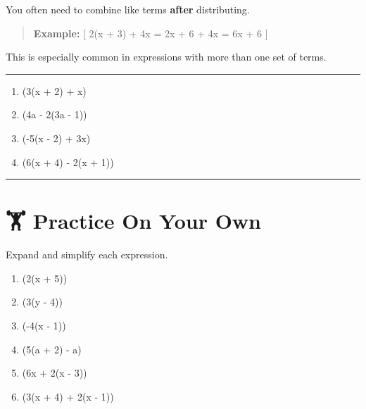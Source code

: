 \documentclass[
  letterpaper,
  DIV=11,
  numbers=noendperiod]{scrreprt}
\providecommand{\tightlist}{%
  \setlength{\itemsep}{0pt}\setlength{\parskip}{0pt}}
\begin{document}
You often need to combine like terms \textbf{after} distributing.

\begin{quote}
\textbf{Example:} {[} 2(x + 3) + 4x = 2x + 6 + 4x = 6x + 6 {]}
\end{quote}

This is especially common in expressions with more than one set of
terms.

\begin{center}\rule{0.5\linewidth}{0.5pt}\end{center}

\begin{enumerate}
\def\labelenumi{\arabic{enumi}.}
\tightlist
\item
  (3(x + 2) + x)\\
\item
  (4a - 2(3a - 1))\\
\item
  (-5(x - 2) + 3x)\\
\item
  (6(x + 4) - 2(x + 1))
\end{enumerate}

\begin{center}\rule{0.5\linewidth}{0.5pt}\end{center}

\section*{🏋️ Practice On Your Own}\label{practice-on-your-own-10}


Expand and simplify each expression.

\begin{enumerate}
\def\labelenumi{\arabic{enumi}.}
\tightlist
\item
  (2(x + 5))\\
\item
  (3(y - 4))\\
\item
  (-4(x - 1))\\
\item
  (5(a + 2) - a)\\
\item
  (6x + 2(x - 3))\\
\item
  (3(x + 4) + 2(x - 1))
\end{enumerate}
\end{document}
